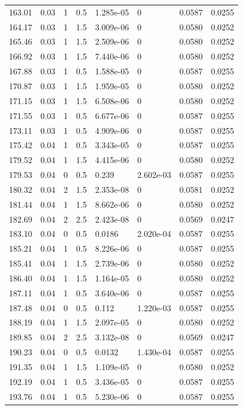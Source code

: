 \documentclass[preview]{standalone}
\begin{document}
{{{\begin{tabular}{L{1.2cm}C{1.2cm} C{0.3cm}C{0.5cm} C{1.4cm}C{1.4cm} C{1.4cm}C{1.4cm}}
  163.01  &  0.03  & 1     & 0.5 &  1.285e-05  & 0  & 0.0587 &  0.0255   \\ 
  164.17  &  0.03  & 1     & 1.5 &  3.009e-06  & 0  & 0.0580 &  0.0252   \\ 
  165.46  &  0.03  & 1     & 1.5 &  2.509e-06  & 0  & 0.0580 &  0.0252   \\ 
  166.92  &  0.03  & 1     & 1.5 &  7.440e-06  & 0  & 0.0580 &  0.0252   \\ 
  167.88  &  0.03  & 1     & 0.5 &  1.588e-05  & 0  & 0.0587 &  0.0255   \\ 
  170.87  &  0.03  & 1     & 1.5 &  1.959e-05  & 0  & 0.0580 &  0.0252   \\ 
  171.15  &  0.03  & 1     & 1.5 &  6.508e-06  & 0  & 0.0580 &  0.0252   \\ 
  171.55  &  0.03  & 1     & 0.5 &  6.677e-06  & 0  & 0.0587 &  0.0255   \\ 
  173.11  &  0.03  & 1     & 0.5 &  4.909e-06  & 0  & 0.0587 &  0.0255   \\ 
  175.42  &  0.04  & 1     & 0.5 &  3.343e-05  & 0  & 0.0587 &  0.0255   \\ 
  179.52  &  0.04  & 1     & 1.5 &  4.415e-06  & 0  & 0.0580 &  0.0252   \\ 
  179.53  &  0.04  & 0     & 0.5 &  0.239  & 2.602e-03  & 0.0587 &  0.0255   \\ 
  180.32  &  0.04  & 2     & 1.5 &  2.353e-08  & 0  & 0.0581 &  0.0252   \\ 
  181.44  &  0.04  & 1     & 1.5 &  8.662e-06  & 0  & 0.0580 &  0.0252   \\ 
  182.69  &  0.04  & 2     & 2.5 &  2.423e-08  & 0  & 0.0569 &  0.0247   \\ 
  183.10  &  0.04  & 0     & 0.5 &  0.0186  & 2.020e-04  & 0.0587 &  0.0255   \\ 
  185.21  &  0.04  & 1     & 0.5 &  8.226e-06  & 0  & 0.0587 &  0.0255   \\ 
  185.41  &  0.04  & 1     & 1.5 &  2.739e-06  & 0  & 0.0580 &  0.0252   \\ 
  186.40  &  0.04  & 1     & 1.5 &  1.164e-05  & 0  & 0.0580 &  0.0252   \\ 
  187.11  &  0.04  & 1     & 0.5 &  3.640e-06  & 0  & 0.0587 &  0.0255   \\ 
  187.48  &  0.04  & 0     & 0.5 &  0.112  & 1.220e-03  & 0.0587 &  0.0255   \\ 
  188.19  &  0.04  & 1     & 1.5 &  2.097e-05  & 0  & 0.0580 &  0.0252   \\ 
  189.85  &  0.04  & 2     & 2.5 &  3.132e-08  & 0  & 0.0569 &  0.0247   \\ 
  190.23  &  0.04  & 0     & 0.5 &  0.0132  & 1.430e-04  & 0.0587 &  0.0255   \\ 
  191.35  &  0.04  & 1     & 1.5 &  1.109e-05  & 0  & 0.0580 &  0.0252   \\ 
  192.19  &  0.04  & 1     & 0.5 &  3.436e-05  & 0  & 0.0587 &  0.0255   \\ 
  193.76  &  0.04  & 1     & 0.5 &  5.230e-06  & 0  & 0.0587 &  0.0255   \\ 
\hline 
\end{tabular} 

}}}
\end{document}
